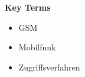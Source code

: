 %
%
% 
% 
% 


{\Large\bfseries Key Terms}
\vspace{0.65cm}

\begin{itemize}
	\setlength{\itemsep}{0pt}
	\item[] GSM
	\item[] Mobilfunk
	\item[] Zugriffsverfahren
\end{itemize}
